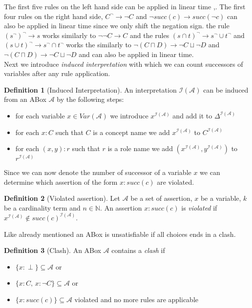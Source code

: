 \documentclass[a4paper,11pt]{scrartcl}
\theoremstyle{break}
\theoremstyle{definition}
\newtheorem{mydef}{Definition}
\begin{document}
The first five rules on the left hand side can be applied in linear time \cite{1},\cite{6}. The first four rules on the right hand side, $C^\neg\rightarrow \neg C$ and $\neg succ(c)\rightarrow succ(\neg c)$ can also be applied in linear time since we only shift the negation sign. the rule $(s^\neg)^\neg\rightarrow s$ works similarly to $\neg\neg C\rightarrow C$ and the rules $(s\cap t)^\neg\rightarrow s^\neg\cup t^\neg$ and $(s\cup t)^\neg\rightarrow s^\neg \cap t^\neg$ works the similarly to $\neg(C\sqcap D)\rightarrow \neg C\sqcup \neg D$ and $\neg(C\sqcap D)\rightarrow \neg C\sqcup \neg D$ and can also be applied in linear time.\\
Next we introduce \textit{induced interpretation} with which we can count successors of variables after any rule application.
\begin{mydef}[Induced Interpretation]
An interpretation $\mathcal{I}(\mathcal{A})$ can be induced from an ABox $\mathcal{A}$ by the following steps:
\begin{itemize}
\item for each variable $x\in Var(\mathcal{A})$ we introduce $x^{\mathcal{I}(\mathcal{A})}$ and add it to $\Delta^{\mathcal{I}(\mathcal{A})}$
\item for each $x:C$ such that $C$ is a concept name we add $x^{\mathcal{I}(\mathcal{A})}$ to $C^{\mathcal{I}(\mathcal{A})}$
\item for each $(x,y):r$ such that $r$ is a role name we add $(x^{\mathcal{I}(\mathcal{A})},y^{\mathcal{I}(\mathcal{A})})$ to $r^{\mathcal{I}(\mathcal{A})}$
\end{itemize}
\end{mydef}
Since we can now denote the number of successor of a variable $x$ we can determine which assertion of the form $x:succ(c)$ are violated.
\begin{mydef}[Violated assertion]
Let $\mathcal{A}$ be a set of assertion, $x$ be a variable, $k$ be a cardinality term and $n\in\mathbb{N}$. An assertion $x:succ(c)$ is \textit{violated} if $x^{\mathcal{I}(\mathcal{A})}\notin succ(c)^{\mathcal{I}(\mathcal{A})}$.
\end{mydef}
Like already mentioned an ABox is unsatisfiable if all choices ends in a clash.
\begin{mydef}[Clash]
An ABox $\mathcal{A}$ contains a \textit{clash} if
\begin{itemize}
\item $\{x:\perp\}\subseteq \mathcal{A}$ or
\item $\{x:C,\,x:\neg C\}\subseteq \mathcal{A}$ or
\item $\{x:succ(c)\}\subseteq \mathcal{A}$ violated and no more rules are applicable
\end{itemize}
\end{mydef}
\iffalse
\end{document}
